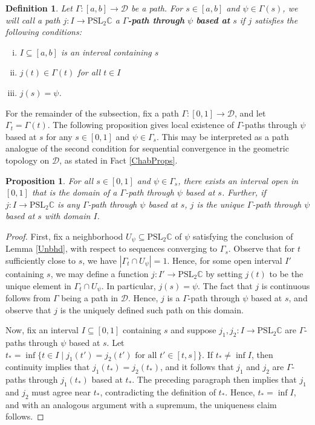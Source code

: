 \documentclass[11pt,leqno]{article}
\newtheorem{defn}[lemma]{Definition}
\newtheorem{prop}[lemma]{Proposition}
\theoremstyle{introdef}
\numberwithin{lemma}{section}
\theoremstyle{definition}
\newcommand{\C}{\mathbb{C}}
\begin{document}
\begin{defn}
\label{GammaPathDef}
    Let $\Gamma:[a,b]\rightarrow\mathcal{D}$ be a path. For $s\in [a,b]$ and $\psi\in\Gamma(s)$, we will call a path $j:I\rightarrow\mathrm{PSL}_2\C$ a $\Gamma$\textbf{-path through }$\psi$\textbf{ based at} $s$ if $j$ satisfies the following  conditions: 
\begin{enumerate}[i.]
    \item $I\subseteq[a,b]$ is an interval containing $s$
    \item $j(t)\in\Gamma(t)$ for all $t\in I$
    \item $j(s)=\psi$.
\end{enumerate}
\end{defn}



For the remainder of the subsection, fix a path $\Gamma:[0,1]\rightarrow\mathcal{D}$, and let $\Gamma_t=\Gamma(t)$. The following proposition gives local existence of $\Gamma$-paths through $\psi$ based at $s$ for any $s\in[0,1]$ and $\psi\in\Gamma_s$. This may be interpreted as a path analogue of the second condition for sequential convergence in the geometric topology on $\mathcal{D}$, as stated in Fact \ref{ChabProps}.

\begin{prop}
\label{pslpath}
    For all $s\in[0,1]$ and $\psi\in\Gamma_s$, there exists an interval open in $[0,1]$ that is the domain of a $\Gamma$-path through $\psi$ based at $s$. Further, if $j:I\rightarrow\mathrm{PSL}_2\C$ is any $\Gamma$-path through $\psi$ based at $s$, $j$ is the unique $\Gamma$-path through $\psi$ based at $s$ with domain $I$.
\end{prop}

\begin{proof}
     First, fix a neighborhood $U_\psi\subseteq\mathrm{PSL}_2\C$ of $\psi$ satisfying the conclusion of Lemma \ref{Unbhd}, with respect to sequences converging to $\Gamma_s$. Observe that for $t$ sufficiently close to $s$, we have $|\Gamma_t\cap U_\psi|=1$. Hence, for some open interval $I'$ containing $s$, we may define a function $j:I'\rightarrow\mathrm{PSL}_2\C$ by setting $j(t)$ to be the unique element in $\Gamma_t\cap U_\psi$. In particular, $j(s)=\psi$. The fact that $j$ is continuous follows from $\Gamma$ being a path in $\mathcal{D}$. Hence, $j$ is a $\Gamma$-path through $\psi$ based at $s$, and observe that $j$ is the uniquely defined such path on this domain. \par

     Now, fix an interval $I\subseteq[0,1]$ containing $s$ and suppose $j_1,j_2:I\rightarrow\mathrm{PSL}_2\C$ are $\Gamma$-paths through $\psi$ based at $s$. Let $t_*=\inf\{t\in I\;|\;j_1(t')=j_2(t')\text{ for all $t'\in[t,s]$}\}$. If $t_*\neq\inf I$, then continuity implies that $j_1(t_*)=j_2(t_*)$, and it follows that $j_1$ and $j_2$ are $\Gamma$-paths through $j_1(t_*)$ based at $t_*$. The preceding paragraph then implies that $j_1$ and $j_2$ must agree near $t_*$, contradicting the definition of $t_*$. Hence, $t_*=\inf I$, and with an analogous argument with a supremum, the uniqueness claim follows.
\end{proof}
\end{document}
